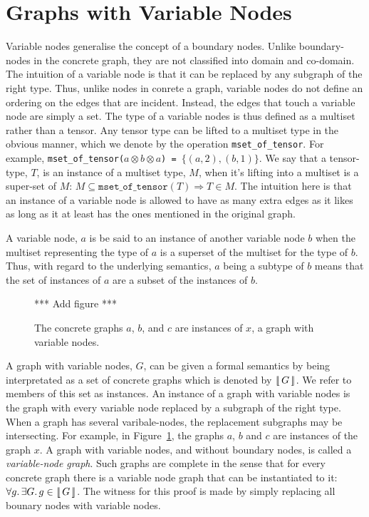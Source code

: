 \documentclass[runningheads]{llncs}
\newcommand{\tensor}{\otimes}
\newcommand{\vinterp}[1]{\lfloor\hspace{-0.27em}|\, #1\, |\hspace{-0.27em}\rfloor}
\begin{document}
\section{Graphs with Variable Nodes}

Variable nodes generalise the concept of a boundary nodes. Unlike
boundary-nodes in the concrete graph, they are not classified into
domain and co-domain. The intuition of a variable node is that it can
be replaced by any subgraph of the right type. Thus, unlike nodes in
conrete a graph, variable nodes do not define an ordering on the edges
that are incident. Instead, the edges that touch a variable node are
simply a set. The type of a variable nodes is thus defined as a
multiset rather than a tensor. Any tensor type can be lifted to a
multiset type in the obvious manner, which we denote by the operation
{\tt mset\_of\_tensor}. For example, {\tt mset\_of\_tensor($a \tensor
  b \tensor a$) = $\{(a,2), (b,1)\}$}. We say that a tensor-type, $T$,
is an instance of a multiset type, $M$, when it's lifting into a
multiset is a super-set of $M$: $ M \subseteq
\mathtt{mset\_of\_tensor}(T) \Longrightarrow T \in M$. The intuition
here is that an instance of a variable node is allowed to have as many
extra edges as it likes as long as it at least has the ones mentioned
in the original graph.

A variable node, $a$ is be said to an instance of another variable
node $b$ when the multiset representing the type of $a$ is a superset
of the multiset for the type of $b$. Thus, with regard to the
underlying semantics, $a$ being a subtype of $b$ means that the set of
instances of $a$ are a subset of the instances of $b$.

\begin{figure}[t]
*** Add figure *** 
\label{node-variable-instances-fig}\caption{The concrete graphs $a$,
  $b$, and $c$ are instances of $x$, a graph with variable nodes.}
\end{figure}

A graph with variable nodes, $G$, can be given a formal semantics by
being interpretated as a set of concrete graphs which is denoted by
$\vinterp{G}$. We refer to members of this set as instances. An
instance of a graph with variable nodes is the graph with every
variable node replaced by a subgraph of the right type. When a graph
has several varibale-nodes, the replacement subgraphs may be
intersecting. For example, in
Figure~\ref{node-variable-instances-fig}, the graphs $a$, $b$ and $c$
are instances of the graph $x$. A graph with variable nodes, and
without boundary nodes, is called a \emph{variable-node graph}. Such
graphs are complete in the sense that for every concrete graph there
is a variable node graph that can be instantiated to it: $\forall
g.\,\exists G.\,g \in \vinterp{G}$. The witness for this proof is made
by simply replacing all bounary nodes with variable nodes.
\end{document}
